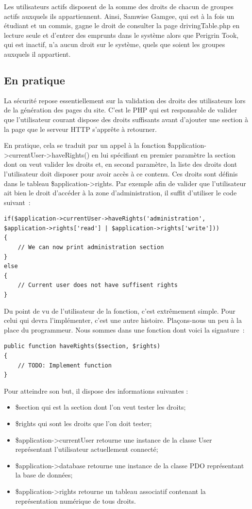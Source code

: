 \documentclass[letter, 11pt]{report}
\begin{document}
Les utilisateurs actifs disposent de la somme des droits de chacun de groupes actifs auxquels ils appartiennent. Ainsi, Samwise Gamgee, qui est à la fois un étudiant et un commis, gagne le droit de consulter la page drivingTable.php en lecture seule et d'entrer des emprunts dans le système alors que Perigrin Took, qui est inactif, n'a aucun droit sur le système, quels que soient les groupes auxquels il appartient.

\subsection{En pratique}
La sécurité repose essentiellement sur la validation des droits des utilisateurs lors de la génération des pages du site. C'est le PHP qui est responsable de valider que l'utilisateur courant dispose des droits suffisants avant d'ajouter une section à la page que le serveur HTTP s’apprête à retourner.

En pratique, cela se traduit par un appel à la fonction \$application->currentUser->haveRights() en lui spécifiant en premier paramètre la section dont on veut valider les droits et, en second paramètre, la liste des droits dont l'utilisateur doit disposer pour avoir accès à ce contenu. Ces droits sont définis dans le tableau \$application->rights. Par exemple afin de valider que l'utilisateur ait bien le droit d'accéder à la zone d'administration, il suffit d'utiliser le code suivant~:

\begin{lstlisting}[style=php]
if($application->currentUser->haveRights('administration', $application->rights['read'] | $application->rights['write']))
{
	// We can now print administration section
}
else
{
	// Current user does not have suffisent rights
}
\end{lstlisting}

Du point de vu de l'utilisateur de la fonction, c'est extrêmement simple. Pour celui qui devra l'implémenter, c'est une autre histoire. Plaçons-nous un peu à la place du programmeur. Nous sommes dans une fonction dont voici la signature~:

\begin{lstlisting}[style=php]
public function haveRights($section, $rights)
{
	// TODO: Implement function
}
\end{lstlisting}

Pour atteindre son but, il dispose des informations suivantes :

\begin{itemize}
	\item \$section qui est la section dont l'on veut tester les droits;
	\item \$rights qui sont les droits que l'on doit tester;
	\item \$application->currentUser retourne une instance de la classe User représentant l'utilisateur actuellement connecté;
	\item \$application->database retourne une instance de la classe PDO représentant la base de données;
	\item \$application->rights retourne un tableau associatif contenant la représentation numérique de tous droits.
\end{itemize}
\end{document}
